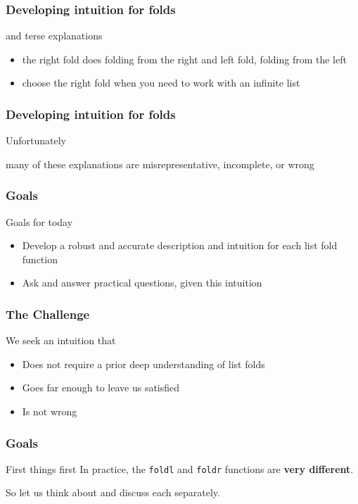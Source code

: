 \begin{frame}
\frametitle{Developing intuition for folds}
\begin{block}{and terse explanations}
\begin{itemize}
\item<1-> the right fold does folding from the right and left fold, folding from the left
\item<2-> choose the right fold when you need to work with an infinite list 
\end{itemize}
\end{block}
\end{frame}

\begin{frame}[fragile]
\frametitle{Developing intuition for folds}
\begin{block}{Unfortunately}
\begin{center}
many of these explanations are misrepresentative, incomplete, or wrong
\end{center}
\end{block}
\end{frame}

\begin{frame}
\frametitle{Goals}
\begin{block}{Goals for today}
\begin{itemize}
\item Develop a robust and accurate description and intuition for each list fold function
\item Ask and answer practical questions, given this intuition
\end{itemize}
\end{block}
\end{frame}

\begin{frame}
\frametitle{The Challenge}
\begin{block}{We seek an intuition that}
\begin{itemize}
\item Does not require a prior deep understanding of list folds
\item Goes far enough to leave us satisfied
\item Is not wrong
\end{itemize}
\end{block}
\end{frame}

\begin{frame}
\frametitle{Goals}
\begin{block}{First things first}
\center
In practice, the \lstinline[basicstyle=\ttfamily]$foldl$ and \lstinline[basicstyle=\ttfamily]$foldr$ functions are \textbf{very different}.
\end{block}
So let us think about and discuss each separately.
\end{frame}

